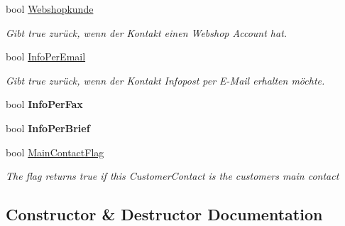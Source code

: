 \begin{DoxyCompactItemize}
\item 
bool \hyperlink{class_products_1_1_model_1_1_entities_1_1_kundenkontakt_a65ba0f1ffe5bc8ab1fe6edaa8a94cd3a}{Webshopkunde}
\begin{DoxyCompactList}\small\item\em Gibt true zurück, wenn der Kontakt einen Webshop Account hat. \end{DoxyCompactList}\item 
bool \hyperlink{class_products_1_1_model_1_1_entities_1_1_kundenkontakt_aef744b312d1fecafbc7494ed184e7955}{Info\+Per\+Email}
\begin{DoxyCompactList}\small\item\em Gibt true zurück, wenn der Kontakt Infopost per E-\/\+Mail erhalten möchte. \end{DoxyCompactList}\item 
bool {\bfseries Info\+Per\+Fax}\hypertarget{class_products_1_1_model_1_1_entities_1_1_kundenkontakt_a3cf996bc3a7aa86678bd1a82b709e740}{}\label{class_products_1_1_model_1_1_entities_1_1_kundenkontakt_a3cf996bc3a7aa86678bd1a82b709e740}

\item 
bool {\bfseries Info\+Per\+Brief}\hypertarget{class_products_1_1_model_1_1_entities_1_1_kundenkontakt_aac98f6f969f107a96d8a4524548f4c09}{}\label{class_products_1_1_model_1_1_entities_1_1_kundenkontakt_aac98f6f969f107a96d8a4524548f4c09}

\item 
bool \hyperlink{class_products_1_1_model_1_1_entities_1_1_kundenkontakt_a2fc6b39ee4933d40887a9f7cde128833}{Main\+Contact\+Flag}
\begin{DoxyCompactList}\small\item\em The flag returns true if this Customer\+Contact is the customer\textquotesingle{}s main contact \end{DoxyCompactList}\end{DoxyCompactItemize}


\subsection{Constructor \& Destructor Documentation}
